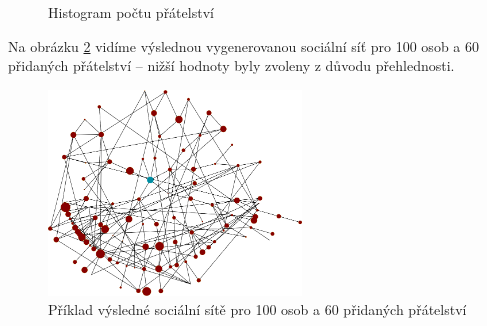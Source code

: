 \documentclass[a4wide,12pt]{report}
\begin{document}
\begin{figure}[h]
  \centering
  \caption{Histogram počtu přátelství}
  \label{fig:hist_fr}
\end{figure}
Na obrázku \ref{fig:socgen} vidíme výslednou vygenerovanou sociální síť pro 100 osob a 60 přidaných přátelství -- nižší hodnoty byly zvoleny z důvodu přehlednosti.
\begin{figure}[h]
  \centering
  \includegraphics[width=0.6\textwidth]{oriflame7_view1.png}
  \caption{Příklad výsledné sociální sítě pro 100 osob a 60 přidaných přátelství}
  \label{fig:socgen}
\end{figure}
\end{document}
